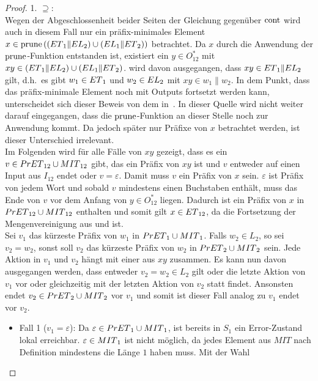 \begin{proof}
  1. \glqq{}$\supseteq$\grqq{}:\\
  Wegen der Abgeschlossenheit beider Seiten der Gleichung gegenüber $\mathrm{cont}{}$
  wird auch in diesem Fall nur ein präfix-minimales Element $x\in
  \mathrm{prune}{}\left(\left(ET{}_1\|EL{}_2\right)\cup
    \left(EL{}_1\|ET{}_2\right)\right)$ betrachtet. Da $x$ durch
  die Anwendung der $\mathrm{prune}{}$-Funktion entstanden ist, existiert ein $y\in
  O_{12}^*$ mit $xy\in(ET{}_1\|EL{}_2)\cup (EL{}_1\|ET{}_2)$. \OBdA{} wird
  davon ausgegangen, dass
  $xy\in ET{}_1\|EL{}_2$ gilt, d.h.\ es gibt $w_1\in ET{}_1$ und $w_2\in EL{}_2$ mit
  $xy\in w_1\|w_2$. In dem Punkt, dass das präfix-minimale Element noch mit
  Outputs fortsetzt werden kann, unterscheidet sich dieser Beweis von dem
  in~\cite{Schlosser2012BA}. In dieser Quelle wird nicht weiter darauf eingegangen, dass
  die $\mathrm{prune}{}$-Funktion an dieser Stelle noch zur Anwendung kommt. Da jedoch später nur
  Präfixe von $x$ betrachtet werden, ist dieser Unterschied irrelevant.\\
  Im Folgenden wird für alle Fälle von $xy$ gezeigt, dass es ein $v\in
  PrET{}_{12}\cup MIT{}_{12}$ gibt, das ein Präfix von $xy$ ist und $v$
  entweder auf einen Input aus $I_{12}$ endet oder $v = \varepsilon$. Damit
  muss $v$ ein Präfix von $x$
  sein. $\varepsilon$ ist Präfix von jedem Wort und sobald $v$ mindestens einen
  Buchstaben enthält, muss das Ende von $v$ vor dem Anfang von $y\in O_{12}^*$
  liegen. Dadurch ist ein Präfix von $x$ in $PrET{}_{12}\cup MIT{}_{12}$
  enthalten und somit gilt $x\in ET{}_{12}$, da \ET{} die Fortsetzung der
  Mengenvereinigung aus \PrET{} und \MIT{} ist.\\
  Sei $v_1$ das kürzeste Präfix von $w_1$ in $PrET{}_1\cup MIT{}_1$. Falls
  $w_2\in L_2$, so sei $v_2=w_2$, sonst soll $v_2$ das kürzeste Präfix von
  $w_2$ in $PrET{}_2\cup MIT{}_2$ sein. Jede Aktion in $v_1$ und $v_2$ hängt mit
  einer aus $xy$ zusammen. Es kann nun davon ausgegangen werden, dass entweder
  $v_2=w_2\in L_2$ gilt oder die letzte Aktion von $v_1$ vor oder
  gleichzeitig mit der letzten Aktion von $v_2$ statt findet. Ansonsten endet
  $v_2\in PrET{}_2\cup MIT{}_2$ vor $v_1$ und somit ist dieser Fall analog zu $v_1$
  endet vor $v_2$.
  \begin{itemize}
    \item Fall 1 ($v_1=\varepsilon$): Da $\varepsilon\in PrET{}_1\cup
      MIT{}_1$, ist bereits in $S_1$ ein Error-Zustand lokal erreichbar. $\varepsilon\in
      MIT{}_1$ ist nicht möglich, da jedes Element aus $MIT$ nach Definition
      mindestens die Länge $1$ haben muss. Mit der Wahl

\end{itemize}
\end{proof}
